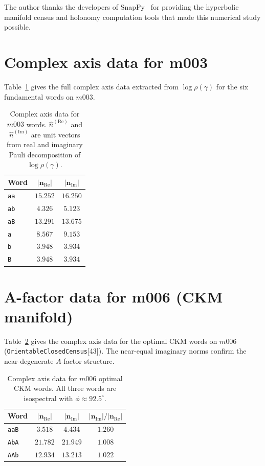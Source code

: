 \documentclass[epjc3]{svjour3}
\begin{document}
\begin{acknowledgement}
The author thanks the developers of SnapPy~\cite{snappy} for
providing the hyperbolic manifold census and holonomy computation
tools that made this numerical study possible.
\end{acknowledgement}

\appendix

\section{Complex axis data for m003}
\label{app:complex_axes}

Table~\ref{tab:complex_axes} gives the full complex axis data
extracted from $\log\rho(\gamma)$ for the six fundamental
words on $m003$.

\begin{table}[h]
\centering
\caption{Complex axis data for $m003$ words.
$\hat{n}^{(\mathrm{Re})}$ and $\hat{n}^{(\mathrm{Im})}$ are
unit vectors from real and imaginary Pauli decomposition of
$\log\rho(\gamma)$.}
\label{tab:complex_axes}
\begin{tabular}{lcc}
\toprule
Word & $|\mathbf{n}_{\mathrm{Re}}|$ & $|\mathbf{n}_{\mathrm{Im}}|$ \\
\midrule
\texttt{aa} & $15.252$ & $16.250$ \\
\texttt{ab} & $4.326$  & $5.123$  \\
\texttt{aB} & $13.291$ & $13.675$ \\
\texttt{a}  & $8.567$  & $9.153$  \\
\texttt{b}  & $3.948$  & $3.934$  \\
\texttt{B}  & $3.948$  & $3.934$  \\
\bottomrule
\end{tabular}
\end{table}

\section{A-factor data for m006 (CKM manifold)}
\label{app:ckm_afactor}

Table~\ref{tab:ckm_complex_axes} gives the complex axis data
for the optimal CKM words on $m006$
(\texttt{OrientableClosedCensus}[43]).
The near-equal imaginary norms confirm the near-degenerate
$A$-factor structure.

\begin{table}[h]
\centering
\caption{Complex axis data for $m006$ optimal CKM words.
All three words are isospectral with $\phi \approx 92.5^\circ$.}
\label{tab:ckm_complex_axes}
\begin{tabular}{lccc}
\toprule
Word & $|\mathbf{n}_{\mathrm{Re}}|$ & $|\mathbf{n}_{\mathrm{Im}}|$
     & $|\mathbf{n}_{\mathrm{Im}}|/|\mathbf{n}_{\mathrm{Re}}|$ \\
\midrule
\texttt{aaB} & $3.518$  & $4.434$ & $1.260$ \\
\texttt{AbA} & $21.782$ & $21.949$ & $1.008$ \\
\texttt{AAb} & $12.934$ & $13.213$ & $1.022$ \\
\bottomrule
\end{tabular}
\end{table}
\end{document}
